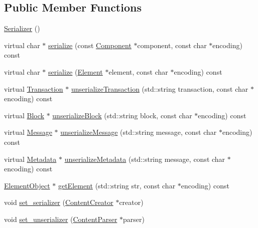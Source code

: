 \subsection*{Public Member Functions}
\begin{DoxyCompactItemize}
\item 
\mbox{\hyperlink{classSerializer_a9fe7f31924098f75278d059f8443fd5b}{Serializer}} ()
\item 
virtual char $\ast$ \mbox{\hyperlink{classSerializer_a5cfe31eb70f4d0c92f2d68c22f39e885}{serialize}} (const \mbox{\hyperlink{classComponent}{Component}} $\ast$component, const char $\ast$encoding) const
\item 
virtual char $\ast$ \mbox{\hyperlink{classSerializer_a38bec517fb3b3cc0778c75b807cb930c}{serialize}} (\mbox{\hyperlink{classElement}{Element}} $\ast$element, const char $\ast$encoding) const
\item 
virtual \mbox{\hyperlink{classTransaction}{Transaction}} $\ast$ \mbox{\hyperlink{classSerializer_ab5fa979a8486be6f49ad10f4810509d7}{unserialize\+Transaction}} (std\+::string transaction, const char $\ast$encoding) const
\item 
virtual \mbox{\hyperlink{classBlock}{Block}} $\ast$ \mbox{\hyperlink{classSerializer_a423fb7c43ca9c23e07000dba0c5a432a}{unserialize\+Block}} (std\+::string block, const char $\ast$encoding) const
\item 
virtual \mbox{\hyperlink{classMessage}{Message}} $\ast$ \mbox{\hyperlink{classSerializer_a1d16df9f35a7580da06a497dfbddffe8}{unserialize\+Message}} (std\+::string message, const char $\ast$encoding) const
\item 
virtual \mbox{\hyperlink{classMetadata}{Metadata}} $\ast$ \mbox{\hyperlink{classSerializer_a64b858f0c2968e888cf796b6f09eed7b}{unserialize\+Metadata}} (std\+::string message, const char $\ast$encoding) const
\item 
\mbox{\hyperlink{classElementObject}{Element\+Object}} $\ast$ \mbox{\hyperlink{classSerializer_ab3bcdbd49167109de13e03878337018a}{get\+Element}} (std\+::string str, const char $\ast$encoding) const
\item 
void \mbox{\hyperlink{classSerializer_aee483f1845ca1b7f7ac4243de9902750}{set\+\_\+serializer}} (\mbox{\hyperlink{classContentCreator}{Content\+Creator}} $\ast$creator)
\item 
void \mbox{\hyperlink{classSerializer_a74ea868b820b4a8472da98c0045418fa}{set\+\_\+unserializer}} (\mbox{\hyperlink{classContentParser}{Content\+Parser}} $\ast$parser)
\end{DoxyCompactItemize}
